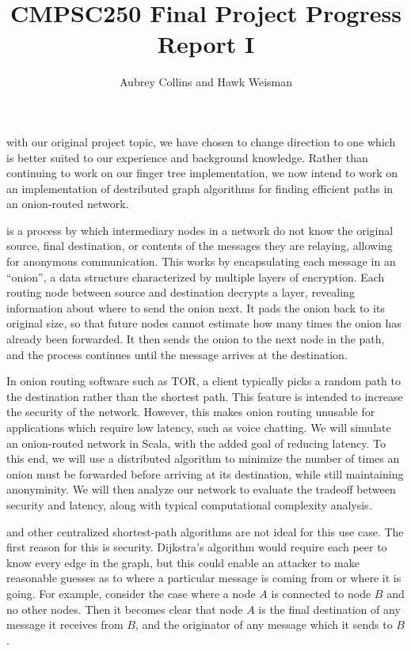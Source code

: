 \documentclass[nobib]{tufte-handout}
\title{CMPSC250 Final Project Progress Report I}
\author{Aubrey Collins and Hawk Weisman}
\begin{document}
\maketitle

 with our original project topic, we have chosen to change direction to one which is better suited to our experience and background knowledge. Rather than continuing to work on our finger tree implementation, we now intend to work on an implementation of destributed graph algorithms for finding efficient paths in an onion-routed network.

 is a process by which intermediary nodes in a network do not know the original source, final destination, or contents of the messages they are relaying, allowing for anonymous communication. This works by encapsulating each message in an ``onion'', a data structure characterized by multiple layers of encryption.\autocite{goldschlag1999CACM,goldschlag2006JSAC} Each routing node between source and destination decrypts a layer, revealing information about where to send the onion next. It pads the onion back to its original size, so that future nodes cannot estimate how many times the onion has already been forwarded. It then sends the onion to the next node in the path, and the process continues until the message arrives at the destination.\autocite{goldschlag1999CACM,goldschlag2006JSAC}

In onion routing software such as TOR, a client typically picks a random path to the destination rather than the shortest path. This feature is intended to increase the security of the network.\autocite{goldschlag1999CACM,goldschlag2006JSAC} However, this makes onion routing unusable for applications which require low latency, such as voice chatting. We will simulate an onion-routed network in Scala, with the added goal of reducing latency. To this end, we will use a distributed algorithm to minimize the number of times an onion must be forwarded before arriving at its destination, while still maintaining anonyminity. We will then analyze our network to evaluate the tradeoff between security and latency, along with typical computational complexity analysis.


 and other centralized shortest-path algorithms are not ideal for this use case. The first reason for this is security. Dijkstra's algorithm would require each peer to know every edge in the graph, but this could enable an attacker to make reasonable guesses as to where a particular message is coming from or where it is going. For example, consider the case where a node $A$ is connected to node $B$ and no other nodes. Then it becomes clear that node $A$ is the final destination of any message it receives from $B$, and the originator of any message which it sends to $B$.
\end{document}
